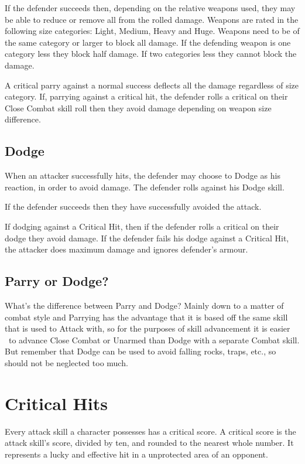 If the defender succeeds then, depending on the relative weapons used, they may be able to reduce or remove all from the rolled damage. Weapons are rated in the following size categories: Light, Medium, Heavy and Huge. Weapons need to be of the same category or larger to block all damage. If the defending weapon is one category less they block half damage. If two categories less they cannot block the damage.

A critical parry against a normal success deflects all the damage regardless of size category. If, parrying against a critical hit, the defender rolls a critical on their Close Combat skill roll then they avoid damage depending on weapon size difference.


\subsection{Dodge}
When an attacker successfully hits, the defender may choose to Dodge as his reaction, in order to avoid damage. The defender rolls against his Dodge skill.

If the defender succeeds then they have successfully avoided the attack. 

If dodging against a Critical Hit, then if the defender rolls a critical on their dodge they avoid damage. If the defender fails his dodge against a Critical Hit, the attacker does maximum damage and ignores defender’s armour.

\subsection{Parry or Dodge?}
What’s the difference between Parry and Dodge? Mainly down to a matter of combat style and Parrying has the advantage that it is based off the same skill that is used to Attack with, so for the purposes of skill advancement it is easier  to advance Close Combat or Unarmed than Dodge with a separate Combat skill. But remember that Dodge can be used to avoid falling rocks, traps, etc., so should not be neglected too much.


\section{Critical Hits}
Every attack skill a character possesses has a critical score. A critical score is the attack skill’s score, divided by ten, and rounded to the nearest whole number. It represents a lucky and effective hit in a unprotected area of an opponent.

